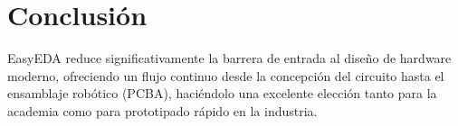 \documentclass[12pt,a4paper]{article}
\begin{document}
\section{Conclusión}
EasyEDA reduce significativamente la barrera de entrada al diseño de hardware moderno, ofreciendo un flujo continuo desde la concepción del circuito hasta el ensamblaje robótico (PCBA), haciéndolo una excelente elección tanto para la academia como para prototipado rápido en la industria.
\end{document}
